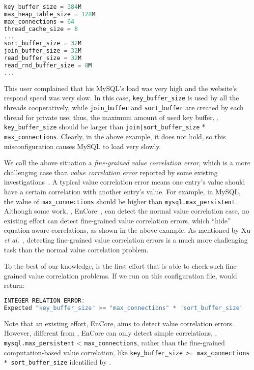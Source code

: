 \begin{lstlisting}[language=C, xleftmargin=.01\textwidth]
key_buffer_size = 384M
max_heap_table_size = 128M
max_connections = 64
thread_cache_size = 8
...
sort_buffer_size = 32M
join_buffer_size = 32M
read_buffer_size = 32M
read_rnd_buffer_size = 8M
...
\end{lstlisting} 

This user complained that his MySQL's load was very high and the website's
respond speed was very slow.
In this case, {\tt key\_buffer\_size} is used by all the threads
cooperatively, while {\tt join\_buffer} and {\tt sort\_buffer} are 
created by each thread for private use; thus, the maximum amount
of used key buffer, \ie, {\tt key\_buffer\_size} should be larger than 
{\tt join|sort\_buffer\_size} * {\tt max\_connections}. 
Clearly, in the above example, it does not hold, 
so this misconfiguration causes MySQL to load very slowly.

We call the above situation a {\em fine-grained value correlation
error}, which is a more challenging case than 
{\em value correlation error} reported
by some existing investigations~\cite{yin11anempirical, zhang14encore}.
A typical value correlation error
means one entry's value should have a certain correlation with
another entry's value. For example, in MySQL,
the value of {\tt max\_connections} should be higher than
{\tt mysql.max\_persistent}. Although some work, \eg,
EnCore~\cite{zhang14encore}, can detect the normal value
correlation case, 
no existing effort can detect fine-grained value correlation
errors, which ``hide'' equation-aware correlations, as shown in
the above example.
As mentioned by Xu {\em et al.}~\cite{xu15hey},
detecting fine-grained value correlation errors 
is a much more challenging
task than the normal value correlation problem.

To the best of our knowledge, \app is the first effort that
is able to check such fine-grained value correlation problems.
If we run \app on this configuration file, \app  would return:

\begin{lstlisting}[language=C, xleftmargin=.01\textwidth]
INTEGER RELATION ERROR:
Expected "key_buffer_size" >= "max_connections" * "sort_buffer_size"
\end{lstlisting} 

Note that an existing effort, EnCore, aims to detect value correlation 
errors. However, different from \app, EnCore can only detect simple
correlations, \eg, {\tt mysql.max\_persistent} < {\tt max\_connections},
rather than the fine-grained computation-based value correlation,
like {\tt key\_buffer\_size >= max\_connections * sort\_buffer\_size}
identified by \app.

